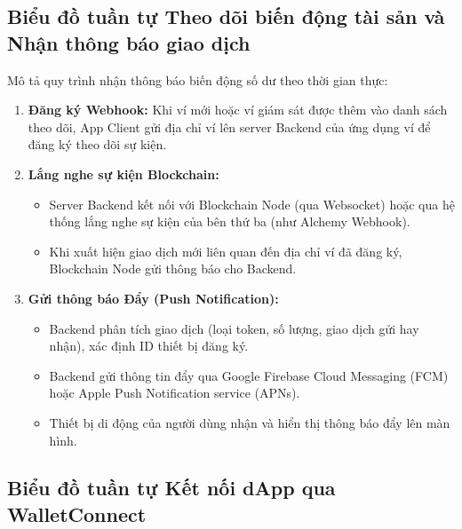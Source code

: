 \documentclass[a4paper]{report}
\begin{document}
\subsection{Biểu đồ tuần tự Theo dõi biến động tài sản và Nhận thông báo giao dịch}


Mô tả quy trình nhận thông báo biến động số dư theo thời gian thực:
\begin{enumerate}
    \item \textbf{Đăng ký Webhook:} Khi ví mới hoặc ví giám sát được thêm vào danh sách theo dõi, App Client gửi địa chỉ ví lên server Backend của ứng dụng ví để đăng ký theo dõi sự kiện.
    \item \textbf{Lắng nghe sự kiện Blockchain:}
    \begin{itemize}
        \item Server Backend kết nối với Blockchain Node (qua Websocket) hoặc qua hệ thống lắng nghe sự kiện của bên thứ ba (như Alchemy Webhook).
        \item Khi xuất hiện giao dịch mới liên quan đến địa chỉ ví đã đăng ký, Blockchain Node gửi thông báo cho Backend.
    \end{itemize}
    \item \textbf{Gửi thông báo Đẩy (Push Notification):}
    \begin{itemize}
        \item Backend phân tích giao dịch (loại token, số lượng, giao dịch gửi hay nhận), xác định ID thiết bị đăng ký.
        \item Backend gửi thông tin đẩy qua Google Firebase Cloud Messaging (FCM) hoặc Apple Push Notification service (APNs).
        \item Thiết bị di động của người dùng nhận và hiển thị thông báo đẩy lên màn hình.
    \end{itemize}
\end{enumerate}

\subsection{Biểu đồ tuần tự Kết nối dApp qua WalletConnect}

\end{document}
